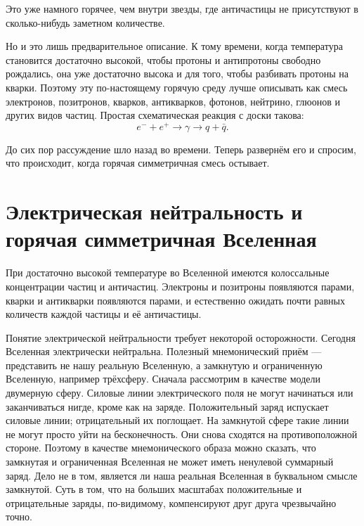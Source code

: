 Это уже намного горячее, чем внутри звезды, где античастицы не присутствуют в сколько-нибудь заметном количестве.

Но и это лишь предварительное описание. К тому времени, когда температура становится достаточно высокой, чтобы протоны и антипротоны свободно рождались, она уже достаточно высока и для того, чтобы разбивать протоны на кварки. Поэтому эту по-настоящему горячую среду лучше описывать как смесь электронов, позитронов, кварков, антикварков, фотонов, нейтрино, глюонов и других видов частиц. Простая схематическая реакция с доски такова:
\[
e^- + e^+ \to \gamma \to q + \bar q.
\]

\begin{classroomqa}
\end{classroomqa}

До сих пор рассуждение шло назад во времени. Теперь развернём его и спросим, что происходит, когда горячая симметричная смесь остывает.

\section{Электрическая нейтральность и горячая симметричная Вселенная}

При достаточно высокой температуре во Вселенной имеются колоссальные концентрации частиц и античастиц. Электроны и позитроны появляются парами, кварки и антикварки появляются парами, и естественно ожидать почти равных количеств каждой частицы и её античастицы.

Понятие электрической нейтральности требует некоторой осторожности. Сегодня Вселенная электрически нейтральна. Полезный мнемонический приём — представить не нашу реальную Вселенную, а замкнутую и ограниченную Вселенную, например трёхсферу. Сначала рассмотрим в качестве модели двумерную сферу. Силовые линии электрического поля не могут начинаться или заканчиваться нигде, кроме как на заряде. Положительный заряд испускает силовые линии; отрицательный их поглощает. На замкнутой сфере такие линии не могут просто уйти на бесконечность. Они снова сходятся на противоположной стороне. Поэтому в качестве мнемонического образа можно сказать, что замкнутая и ограниченная Вселенная не может иметь ненулевой суммарный заряд. Дело не в том, является ли наша реальная Вселенная в буквальном смысле замкнутой. Суть в том, что на больших масштабах положительные и отрицательные заряды, по-видимому, компенсируют друг друга чрезвычайно точно.

